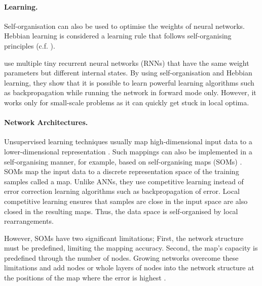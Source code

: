 \paragraph{Learning.} Self-organisation can also be used to optimise the weights of neural networks.
Hebbian learning is considered a learning rule that follows self-organising principles  (c.f. ).

 use multiple tiny recurrent neural networks (RNNs) that have the same weight parameters but different internal states.
By using self-organisation and Hebbian learning, they show that it is possible to learn powerful learning algorithms such as backpropagation while running the network in forward mode only.
However, it works only for small-scale problems as it can quickly get stuck in local optima.



\paragraph{Network Architectures.}
Unsupervised learning techniques usually map high-dimensional input data to a lower-dimensional representation . Such mappings can also be implemented in a self-organising manner, for example, based on self-organising maps (SOMs) .
SOMs map the input data to a discrete representation space of the training samples called a map.
Unlike ANNs, they use competitive learning instead of error correction learning algorithms such as backpropagation of error.
Local competitive learning ensures that samples are close in the input space are also closed in the resulting maps.
Thus, the data space is self-organised by local rearrangements.

However, SOMs have two significant limitations; First, the network structure must be predefined, limiting the mapping accuracy. Second, the map's capacity is predefined through the number of nodes.
Growing networks overcome these limitations and add nodes or whole layers of nodes into the network structure at the positions of the map where the error is highest .

